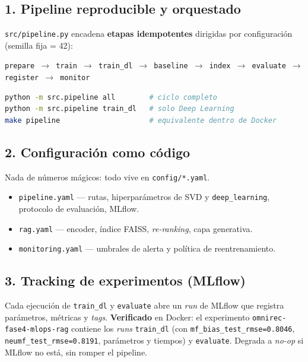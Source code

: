 \documentclass[11pt,a4paper]{article}
\newcommand{\code}[1]{\textcolor{omnidark}{\texttt{#1}}}
\begin{document}
\subsection{1. Pipeline reproducible y orquestado}
\code{src/pipeline.py} encadena \textbf{etapas idempotentes} dirigidas por configuración (semilla fija = 42):
\begin{center}
\code{prepare $\rightarrow$ train $\rightarrow$ train\_dl $\rightarrow$ baseline $\rightarrow$ index $\rightarrow$ evaluate $\rightarrow$ register $\rightarrow$ monitor}
\end{center}
\begin{lstlisting}[language=bash]
python -m src.pipeline all        # ciclo completo
python -m src.pipeline train_dl   # solo Deep Learning
make pipeline                     # equivalente dentro de Docker
\end{lstlisting}

\subsection{2. Configuración como código}
Nada de números mágicos: todo vive en \code{config/*.yaml}.
\begin{itemize}
\item \code{pipeline.yaml} — rutas, hiperparámetros de SVD y \code{deep\_learning}, protocolo de evaluación, MLflow.
\item \code{rag.yaml} — encoder, índice FAISS, \textit{re-ranking}, capa generativa.
\item \code{monitoring.yaml} — umbrales de alerta y política de reentrenamiento.
\end{itemize}

\subsection{3. Tracking de experimentos (MLflow)}
Cada ejecución de \code{train\_dl} y \code{evaluate} abre un \textit{run} de MLflow que registra parámetros, métricas y \textit{tags}. \textbf{Verificado} en Docker: el experimento \code{omnirec-fase4-mlops-rag} contiene los \textit{runs} \code{train\_dl} (con \code{mf\_bias\_test\_rmse=0.8046}, \code{neumf\_test\_rmse=0.8191}, parámetros y tiempos) y \code{evaluate}. Degrada a \textit{no-op} si MLflow no está, sin romper el pipeline.
\end{document}
